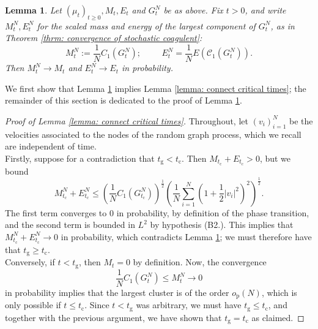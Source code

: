 \documentclass[11pt, notitlepage]{article}
\newtheorem{lem}[thm]{Lemma}
\begin{document}
\begin{lem} \label{lemma: WCOG} Let $(\mu_t)_{t\ge 0}, M_t, E_t$ and $G^N_t$ be as above. Fix $t>0$, and write $M^N_t, E^N_t$ for the scaled mass and energy of the largest component of $G^N_t$, as in Theorem \ref{thrm: convergence of stochastic coagulent}: \begin{equation} M^N_t:=\frac{1}{N}C_1(G^N_t); \hspace{1cm} E^N_t=\frac{1}{N}E(\mathcal{C}_1(G^N_t)). \end{equation} Then $M^N_t \rightarrow M_t$ and $E^N_t\rightarrow E_t$ in probability.
\end{lem}
We first show that Lemma \ref{lemma: WCOG} implies Lemma \ref{lemma: connect critical times}; the remainder of this section is dedicated to the proof of Lemma \ref{lemma: WCOG}.
\begin{proof}[Proof of Lemma \ref{lemma: connect critical times}] Throughout, let $(v_i)_{i=1}^N$ be the velocities associated to the nodes of the random graph process, which we recall are independent of time. \medskip \\Firstly, suppose for a contradiction that $t_\mathrm{g}< t_\mathrm{c}$. Then $M_{t_\mathrm{c}}+E_{t_\mathrm{c}}>0$, but we bound \begin{equation}\label{eq: use of CS 0} M^N_{t_\mathrm{c}}+E^N_{t_\mathrm{c}} \le \left(\frac{1}{N}C_1(G^N_{t_\mathrm{c}})\right)^\frac{1}{2}\left(\frac{1}{N}\sum_{i=1}^N(1+\frac{1}{2}|v_i|^2)^2\right)^\frac{1}{2}.\end{equation} The first term converges to $0$ in probability, by definition of the phase transition, and the second term is bounded in $L^2$ by hypothesis (B2.). This implies that $M^N_{t_\mathrm{c}}+E^N_{t_\mathrm{c}}\rightarrow 0$ in probability, which contradicts Lemma \ref{lemma: WCOG}; we must therefore have that $t_\mathrm{g}\ge t_\mathrm{c}.$ \medskip \\ Conversely, if $t< t_\mathrm{g}$, then $M_t=0$ by definition. Now, the convergence \begin{equation} \frac{1}{N}C_1(G^N_t) \le M^N_t\rightarrow 0\end{equation} in probability implies that the largest cluster is of the order $o_\mathrm{p}(N)$, which is only possible if $t\le t_\mathrm{c}$. Since $t<t_\mathrm{g}$ was arbitrary, we must have $t_\mathrm{g}\le t_\mathrm{c}$, and together with the previous argument, we have shown that $t_\mathrm{g}=t_\mathrm{c}$ as claimed.  \end{proof} 
\end{document}
